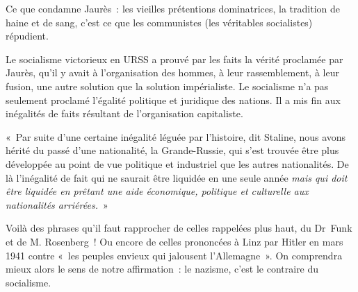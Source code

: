 \documentclass[french,twoside]{book} %
\newenvironment{quoteblock}%
  {\begin{quoting}}
  {\end{quoting}}
\newenvironment{quotebar}{%
    \def\FrameCommand{{\color{rubric!10!}\vrule width 0.5em} \hspace{0.9em}}%
    \def\OuterFrameSep{\itemsep} %
    \MakeFramed {\advance\hsize-\width \FrameRestore}
  }%
  {%
    \endMakeFramed
  }
\renewenvironment{quoteblock}%
  {%
    \savenotes
    \setstretch{0.9}
    \normalfont
    \begin{quotebar}
  }
  {%
    \end{quotebar}
    \spewnotes
  }
\begin{document}
\noindent Ce que condamne Jaurès : les vieilles prétentions dominatrices, la tradition de haine et de sang, c’est ce que les communistes (les véritables socialistes) répudient.\par
Le socialisme victorieux en URSS a prouvé par les faits la vérité proclamée par Jaurès, qu’il y avait à l’organisation des hommes, à leur rassemblement, à leur fusion, une autre solution que la solution impérialiste. Le socialisme n’a pas seulement proclamé l’égalité politique et juridique des nations. Il a mis fin aux inégalités de faits résultant de l’organisation capitaliste.\par

\begin{quoteblock}
 \noindent « Par suite d’une certaine inégalité léguée par l’histoire, dit Staline, nous avons hérité du passé d’une nationalité, la Grande-Russie, qui s’est trouvée être plus développée au point de vue politique et industriel que les autres nationalités. De là l’inégalité de fait qui ne saurait être liquidée en une seule année \emph{mais qui doit être liquidée en prêtant une aide économique, politique et culturelle aux nationalités arriérées.} »
 \end{quoteblock}

\noindent Voilà des phrases qu’il faut rapprocher de celles rappelées plus haut, du Dr Funk et de M. Rosenberg ! Ou encore de celles prononcées à Linz par Hitler en mars 1941 contre « les peuples envieux qui jalousent l’Allemagne ». On comprendra mieux alors le sens de notre affirmation : le nazisme, c’est le contraire du socialisme.
\end{document}
